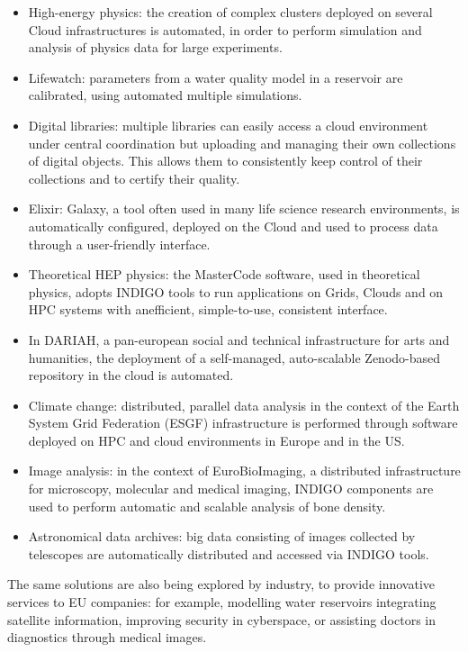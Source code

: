 \documentclass{article}
\begin{document}
{\begin{itemize}
\item High-energy physics: the creation of complex clusters deployed on several Cloud infrastructures is automated, in order to perform simulation and analysis of physics data for large experiments. 
\item Lifewatch: parameters from a water quality model in a reservoir are calibrated, using automated multiple simulations. 
\item Digital libraries: multiple libraries can easily access a cloud environment under central coordination but uploading and managing their own collections of digital objects. This allows them to consistently keep control of their collections and to certify their quality. 
\item Elixir: Galaxy, a tool often used in many life science research environments, is automatically configured, deployed on the Cloud and used to process data through a user-friendly interface. 
\item Theoretical HEP physics: the MasterCode software, used in theoretical physics, adopts INDIGO tools to run applications on Grids, Clouds and on HPC systems with anefficient, simple-to-use, consistent interface. 
\item In DARIAH, a pan-european social and technical infrastructure for arts and humanities, the deployment of a self-managed, auto-scalable Zenodo-based  repository in the cloud is automated. 
\item Climate change: distributed, parallel data analysis in the context of the Earth System Grid Federation (ESGF) infrastructure is performed through software deployed on HPC and cloud environments in Europe and in the US. 
\item Image analysis: in the context of EuroBioImaging, a distributed infrastructure for microscopy, molecular and medical imaging, INDIGO components are used to perform automatic and scalable analysis of bone density. 
\item Astronomical data archives: big data consisting of images collected by telescopes are automatically distributed and accessed via INDIGO tools. 
\end{itemize}

The same solutions are also being explored by industry, to provide innovative services to EU companies: for example, modelling water reservoirs integrating satellite information, improving security in cyberspace, or assisting doctors in diagnostics through medical images. 

}
\end{document}
